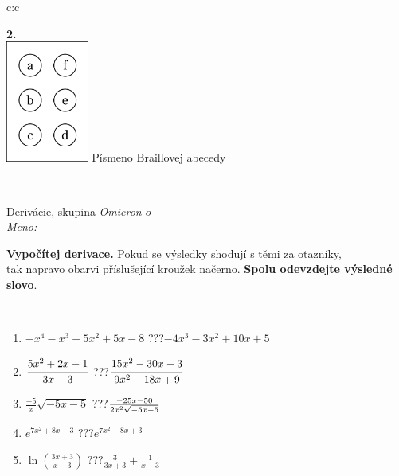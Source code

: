 \documentclass[10pt]{report}
\newcommand\omicron{o}
\begin{document}
\begin{tabular}{c:c}
\begin{minipage}[c][104.5mm][t]{0.5\linewidth}
\begin{center}
\begin{minipage}{0.20\linewidth}
\begin{center}
{\Huge\bfseries 2.} \\[2mm]
\includegraphics[height=40mm]{../images/braille.png}
{\small Písmeno Braillovej abecedy}
\end{center}
\end{minipage}
\end{center}
\end{minipage}
\\ \hdashline
\begin{minipage}[c][104.5mm][t]{0.5\linewidth}
\begin{center}
\vspace{7mm}
{\huge Derivácie, skupina \textit{Omicron $\omicron$} -}\\[5mm]
\textit{Meno:}\phantom{xxxxxxxxxxxxxxxxxxxxxxxxxxxxxxxxxxxxxxxxxxxxxxxxxxxxxxxxxxxxxxxxx}\\[5mm]
\begin{minipage}{0.95\linewidth}
\begin{center}
\textbf{Vypočítej derivace.} Pokud se výsledky shodují s těmi za otazníky,\\tak napravo obarvi příslušející kroužek načerno. \textbf{Spolu odevzdejte výsledné slovo}.
\end{center}
\end{minipage}
\\[1mm]
\begin{minipage}{0.79\linewidth}
\begin{center}
\begin{varwidth}{\linewidth}
\begin{enumerate}
\normalsize
\item $-x^4-x^3+5x^2+5x-8$\quad \dotfill\; ???\;\dotfill \quad $-4x^3-3x^2+10x+5$
\item $\cfrac{5x^2+2x-1}{3x-3}$\quad \dotfill\; ???\;\dotfill \quad $\cfrac{15x^2-30x-3}{9x^2-18x+9}$
\item $\frac{-5}{x}\sqrt{-5x-5}$\quad \dotfill\; ???\;\dotfill \quad $\frac{-25x-50}{2x^2 \sqrt{\smash[b]{-5x-5}}}$
\item $e^{7x^2+8x+3}$\quad \dotfill\; ???\;\dotfill \quad $e^{7x^2+8x+3}$
\item $\ln{\left(\frac{3x+3}{x-3}\right)}$\quad \dotfill\; ???\;\dotfill \quad $\frac{3}{3x+3}+\frac{1}{x-3}$

\end{enumerate}
\end{varwidth}
\end{center}
\end{minipage}
\end{center}
\end{minipage}
\end{tabular}
\end{document}
